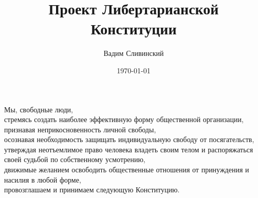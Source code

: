 \documentclass[12pt]{constitution}
\begin{document}
\title{Проект Либертарианской Конституции}
\author{Вадим Сливинский}
\date{\today}
\maketitle
\setcounter{tocdepth}{0}
\tableofcontents
\newpage

Мы, свободные люди,\\
стремясь создать наиболее эффективную форму общественной организации,\\
признавая неприкосновенность личной свободы,\\
осознавая необходимость защищать индивидуальную свободу от посягательств,\\
утверждая неотъемлимое право человека владеть своим телом и распоряжаться своей судьбой по собственному усмотрению, \\
движимые желанием освободить общественные отношения от принуждения и насилия в любой форме,\\
провозглашаем и принимаем следующую Конституцию.


\end{document}
